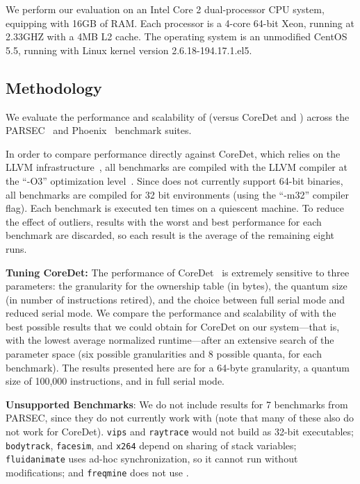 \label{sec:dthreadsevaluation}

We perform our evaluation on an Intel Core 2 dual-processor CPU system, equipping with 16GB of RAM. Each processor is a 4-core 64-bit Xeon, running at 2.33GHZ with a 4MB L2 cache. The operating system is an unmodified CentOS 5.5, running with Linux kernel version 2.6.18-194.17.1.el5.

\subsection{Methodology}

We evaluate the performance and scalability of \dthreads{} (versus CoreDet and \pthreads{}) across the PARSEC~\cite{parsec} and Phoenix~\cite{phoenix-hpca} benchmark suites.  

In order to compare performance directly against CoreDet, which relies on the LLVM infrastructure~\cite{LLVM:CGO04}, all benchmarks are compiled with the LLVM compiler at the ``-O3'' optimization level~\cite{LLVM:CGO04}. Since \dthreads{} does not currently support 64-bit binaries, all benchmarks are compiled for 32 bit environments (using the ``-m32'' compiler flag). Each benchmark is executed ten times on a quiescent machine. To reduce the effect of outliers, results with the worst and best performance for each benchmark are discarded,
so each result is the average of the remaining eight runs.

\textbf{Tuning CoreDet:} 
The performance of CoreDet~\cite{Bergan:2010:CCR:1736020.1736029} is extremely sensitive to three parameters: the granularity for the ownership table (in bytes), the quantum size (in number of instructions retired), and the choice between full serial mode and reduced serial mode. We compare the performance and scalability of \dthreads{} with the best possible results that we could obtain for CoreDet on our system---that is, with the lowest average normalized
runtime---after an extensive search of the parameter space (six possible granularities and 8 possible quanta, for each benchmark). The results presented here are for a 64-byte granularity, a quantum size of 100,000 instructions, and in full serial mode.

\textbf{Unsupported Benchmarks}: We do not include results for 7 benchmarks from PARSEC, since they do not currently work with \dthreads{} (note that many of these also do not work for CoreDet). \texttt{vips} and \texttt{raytrace} would not build as 32-bit executables; \texttt{bodytrack}, \texttt{facesim}, and \texttt{x264} depend on sharing of stack variables;
\texttt{fluidanimate} uses ad-hoc synchronization, so it cannot run without modifications; and \texttt{freqmine} does not use \pthreads{}.

